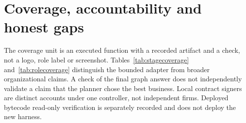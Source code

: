 \documentclass[11pt]{article}
\begin{document}


\section{Coverage, accountability and honest gaps}

The coverage unit is an executed function with a recorded artifact and a check, not a logo, role label or screenshot. Tables~\ref{tab:stagecoverage} and~\ref{tab:rolecoverage} distinguish the bounded adapter from broader organizational claims. A check of the final graph answer does not independently validate a claim that the planner chose the best business. Local contract signers are distinct accounts under one controller, not independent firms. Deployed bytecode read-only verification is separately recorded and does not deploy the new harness.
\end{document}
